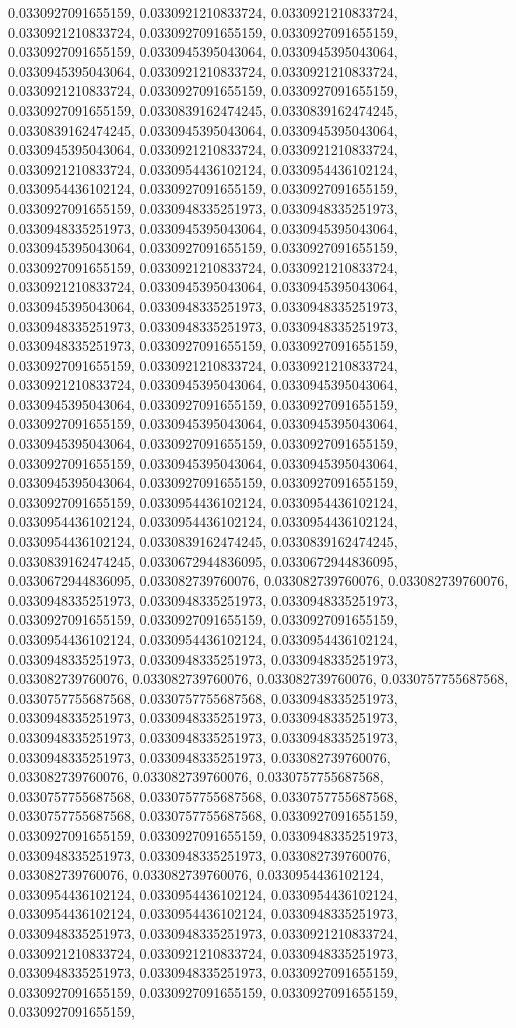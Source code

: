 \documentclass[
  ,man]{apa6}
\begin{document}
0.0330927091655159, 0.0330921210833724, 0.0330921210833724, 0.0330921210833724, 0.0330927091655159, 0.0330927091655159, 0.0330927091655159, 0.0330945395043064, 0.0330945395043064, 0.0330945395043064, 0.0330921210833724, 0.0330921210833724, 0.0330921210833724, 0.0330927091655159, 0.0330927091655159, 0.0330927091655159, 0.0330839162474245, 0.0330839162474245, 0.0330839162474245, 0.0330945395043064, 0.0330945395043064, 0.0330945395043064, 0.0330921210833724, 0.0330921210833724, 0.0330921210833724, 0.0330954436102124,
0.0330954436102124, 0.0330954436102124, 0.0330927091655159, 0.0330927091655159, 0.0330927091655159, 0.0330948335251973, 0.0330948335251973, 0.0330948335251973, 0.0330945395043064, 0.0330945395043064, 0.0330945395043064, 0.0330927091655159, 0.0330927091655159, 0.0330927091655159, 0.0330921210833724, 0.0330921210833724, 0.0330921210833724, 0.0330945395043064, 0.0330945395043064, 0.0330945395043064, 0.0330948335251973, 0.0330948335251973, 0.0330948335251973, 0.0330948335251973, 0.0330948335251973, 0.0330948335251973,
0.0330927091655159, 0.0330927091655159, 0.0330927091655159, 0.0330921210833724, 0.0330921210833724, 0.0330921210833724, 0.0330945395043064, 0.0330945395043064, 0.0330945395043064, 0.0330927091655159, 0.0330927091655159, 0.0330927091655159, 0.0330945395043064, 0.0330945395043064, 0.0330945395043064, 0.0330927091655159, 0.0330927091655159, 0.0330927091655159, 0.0330945395043064, 0.0330945395043064, 0.0330945395043064, 0.0330927091655159, 0.0330927091655159, 0.0330927091655159, 0.0330954436102124, 0.0330954436102124,
0.0330954436102124, 0.0330954436102124, 0.0330954436102124, 0.0330954436102124, 0.0330839162474245, 0.0330839162474245, 0.0330839162474245, 0.0330672944836095, 0.0330672944836095, 0.0330672944836095, 0.033082739760076, 0.033082739760076, 0.033082739760076, 0.0330948335251973, 0.0330948335251973, 0.0330948335251973, 0.0330927091655159, 0.0330927091655159, 0.0330927091655159, 0.0330954436102124, 0.0330954436102124, 0.0330954436102124, 0.0330948335251973, 0.0330948335251973, 0.0330948335251973, 0.033082739760076,
0.033082739760076, 0.033082739760076, 0.0330757755687568, 0.0330757755687568, 0.0330757755687568, 0.0330948335251973, 0.0330948335251973, 0.0330948335251973, 0.0330948335251973, 0.0330948335251973, 0.0330948335251973, 0.0330948335251973, 0.0330948335251973, 0.0330948335251973, 0.033082739760076, 0.033082739760076, 0.033082739760076, 0.0330757755687568, 0.0330757755687568, 0.0330757755687568, 0.0330757755687568, 0.0330757755687568, 0.0330757755687568, 0.0330927091655159, 0.0330927091655159, 0.0330927091655159,
0.0330948335251973, 0.0330948335251973, 0.0330948335251973, 0.033082739760076, 0.033082739760076, 0.033082739760076, 0.0330954436102124, 0.0330954436102124, 0.0330954436102124, 0.0330954436102124, 0.0330954436102124, 0.0330954436102124, 0.0330948335251973, 0.0330948335251973, 0.0330948335251973, 0.0330921210833724, 0.0330921210833724, 0.0330921210833724, 0.0330948335251973, 0.0330948335251973, 0.0330948335251973, 0.0330927091655159, 0.0330927091655159, 0.0330927091655159, 0.0330927091655159, 0.0330927091655159,
\end{document}
